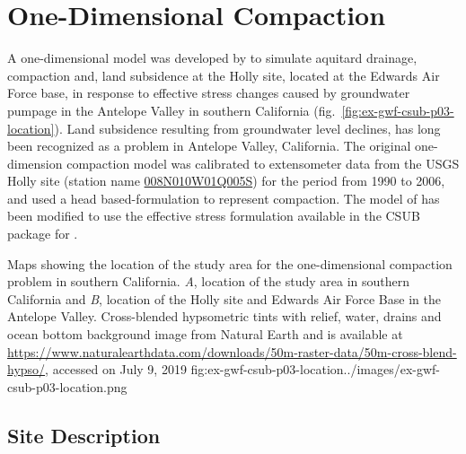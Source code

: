 \section{One-Dimensional Compaction}

A one-dimensional \mf model was developed by \cite{sneed2008} to simulate aquitard drainage, compaction and, land subsidence at the Holly site, located at the Edwards Air Force base, in response to effective stress changes caused by groundwater pumpage in the Antelope Valley in southern California (fig.~\ref{fig:ex-gwf-csub-p03-location}). Land subsidence resulting from groundwater level declines, has long been recognized as a problem in Antelope Valley, California. The original one-dimension compaction model was calibrated to extensometer data from the USGS Holly site (station name \href{https://waterdata.usgs.gov/ca/nwis/dv/?site_no=344835117531305}{008N010W01Q005S}) for the period from 1990 to 2006, and used a head based-formulation to represent compaction. The model of \cite{sneed2008} has been modified to use the effective stress formulation available in the CSUB package for \mf.

\begin{StandardFigure}{
                                     Maps showing the location of the study area for the one-dimensional 
                                     compaction problem in southern California. \textit{A}, location of the 
                                     study area in southern California and \textit{B}, location of the Holly site and
                                     Edwards Air Force Base in the Antelope Valley. Cross-blended hypsometric 
                                     tints with relief, water, drains and ocean bottom background image from 
                                     Natural Earth and is available at 
                                     \url{https://www.naturalearthdata.com/downloads/50m-raster-data/50m-cross-blend-hypso/}, 
                                     accessed on July 9, 2019 
                                     }{fig:ex-gwf-csub-p03-location}{../images/ex-gwf-csub-p03-location.png}
\end{StandardFigure}                                 

\subsection{Site Description}

